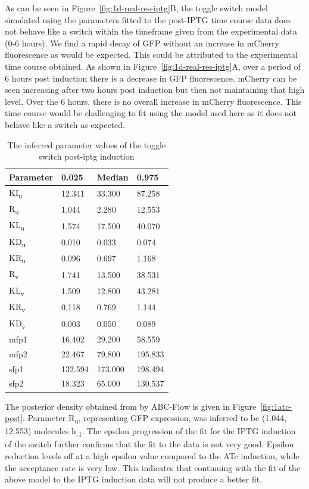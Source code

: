 As can be seen in Figure~\ref{fig:1d-real-res-iptg}B, the toggle switch model simulated using the parameters fitted to the post-IPTG time course data does not behave like a switch within the timeframe given from the experimental data (0-6 hours). We find a rapid decay of GFP without an increase in mCherry fluorescence as would be expected. This could be attributed to the experimental time course obtained. As shown in Figure~\ref{fig:1d-real-res-iptg}A, over a period of 6 hours post induction there is a decrease in GFP fluorescence. mCherry can be seen increasing after two hours post induction but then not maintaining that high level. Over the 6 hours, there is no overall increase in mCherry fluorescence. This time course would be challenging to fit using the model used here as it does not behave like a switch as expected. 

\begin{table}[htbp]
\centering
\caption{The inferred parameter values of the toggle switch post-\acrshort{iptg} induction}
\label{tab:inf_params_iptg}
\begin{tabular}{@{}llll@{}}
\toprule
Parameter & 0.025 & Median & 0.975 \\ \midrule
KI\textsubscript{u} & 12.341 & 33.300 & 87.258 \\
R\textsubscript{u} & 1.044 & 2.280 & 12.553 \\
KL\textsubscript{u} & 1.574 & 17.500 & 40.070 \\
KD\textsubscript{u} & 0.010 & 0.033 & 0.074 \\
KR\textsubscript{u} & 0.096 & 0.697 & 1.168 \\
R\textsubscript{v} & 1.741 & 13.500 & 38.531 \\
KL\textsubscript{v} & 1.509 & 12.800 & 43.281 \\
KR\textsubscript{v} & 0.118 & 0.769 & 1.144 \\
KD\textsubscript{v} & 0.003 & 0.050 & 0.089 \\
mfp1 & 16.402 & 29.200 & 58.559 \\
mfp2 & 22.467 & 79.800 & 195.833 \\
sfp1 & 132.594 & 173.000 & 198.494 \\
sfp2 & 18.323 & 65.000 & 130.537 \\ \bottomrule
\end{tabular}
\end{table}


The posterior density obtained from by ABC-Flow is given in Figure~\ref{fig:1atc-post}. Parameter R\textsubscript{u}, representing GFP expression, was inferred to be (1.044, 12.553) molecules h\textsubscript{-1}.  The epsilon progression of the fit for the IPTG induction of the switch further confirms that the fit to the data is not very good. Epsilon reduction levels off at a high epsilon value compared to the ATc induction, while the acceptance rate is very low. This indicates that continuing with the fit of the above model to the IPTG induction data will not produce a better fit.   

